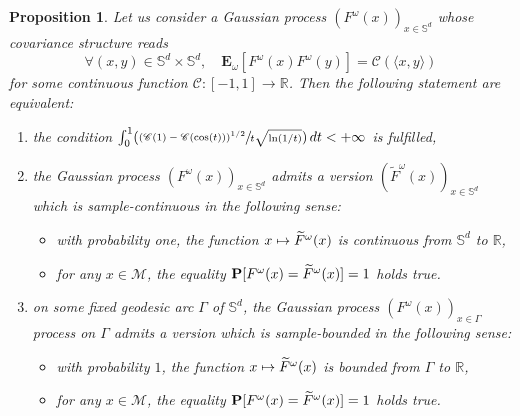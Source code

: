 \documentclass[11pt]{article}
\newcommand{\Psfrac}[2]{(\sfrac{#1}{#2})}
\def\mto{\mathchoice{\longmapsto}{\mapsto}{\mapsto}{\mapsto}}
\newenvironment{enumeratei}
{\bgroup\def\theenumi{\roman{enumi}}\def\theenumii{\arabic{enumii}}\begin{enumerate}}
{\end{enumerate}\egroup}
\theoremstyle{theorem}
\newtheorem{prop}[theo]{Proposition}
\theoremstyle{definition}
\newcommand\R{\mathbb{R}}
\newcommand\E{\mathbf{E}}
\newcommand\bbS{\mathbb{S}}
\begin{document}
\begin{prop}\label{casSd}
Let us consider a Gaussian process $(F^\omega(x))_{x\in \bbS^d}$ whose covariance structure reads
\begin{equation}\label{covSD}
\forall (x,y)\in \bbS^d\times \bbS^d, \quad \E_\omega[F^\omega(x) F^\omega(y)]=\mathscr{C}(\langle x, y\rangle)
\end{equation}
for some continuous function $\mathscr{C}:[-1,1]\to \R$. Then the following statement are equivalent:
\begin{enumeratei}
\item\label{casSdi} the condition $\int_{0}^{1} \Psfrac{(\mathscr{C}(1)-\mathscr{C}(\cos(t)))^{1/2}}{t\sqrt{\ln(1/t)}}\, dt<+\infty$ is fulfilled,
\item\label{casSdii} the Gaussian process $(F^\omega(x))_{x\in \bbS^d}$ admits a version $(\widetilde{F}^\omega(x))_{x\in \bbS^d}$ which is sample-continuous in the following sense:
\begin{itemize}
\item with probability one, the function $x\mto \widetilde{F}^{\omega}(x)$ is continuous from
$\bbS^d$ to $\R$,
\item for any $x\in \mathcal{M}$, the equality $\P[F^{\omega}(x)=\widetilde{F}^{\omega}(x)]=1$ holds true.
\end{itemize}
\item\label{casSdiii} on some fixed geodesic arc $\Gamma$ of $\bbS^d$, the Gaussian process $(F^\omega(x))_{x\in \Gamma}$ process on $\Gamma$ admits a version which is sample-bounded in the following sense:
\begin{itemize}
\item with probability $1$, the function $x \mto \widetilde{F}^{\omega}(x)$ is bounded from $\Gamma$ to $\R$,
\item for any $x\in \mathcal{M}$, the equality $\P[F^{\omega}(x)=\widetilde{F}^{\omega}(x)]=1$ holds true.
\end{itemize}
\end{enumeratei}
\end{prop}
\end{document}
